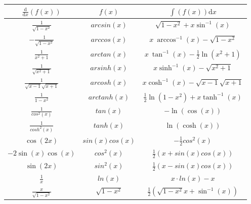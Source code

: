 \documentclass[paper=a3,paper=landscape, fontsize=9pt, DIV=30]{scrartcl}
\begin{document}
\begin{multicols*}{4}
        \begin{tabular}{|c|c|c|}
          \hline
           $\frac{\mathrm d}{\mathrm d x} \left( f(x) \right)$  & $f(x)$           & $\int \left( f(x) \right) \mathrm{d}x$   \\ \hline
           $\frac{1}{\sqrt{1-x^2}}$                             & $arcsin(x)$      & $\sqrt{1-x^2}+x \sin^{-1}(x)$             \\ \hline
           $-\frac{1}{\sqrt{1-x^2}}$                            & $arccos(x)$      & $x \ \arccos^{-1}(x)-\sqrt{1-x^2}$        \\ \hline
           $\frac{1}{x^2+1}$                                    & $arctan(x)$      & $x \ \tan^{-1}(x)-\frac{1}{2}\ln(x^2+1)$  \\ \hline
           $\frac{1}{\sqrt{x^2+1}}$                             & $arsinh(x)$      & $x \sinh^{-1}(x)-\sqrt{x^2+1}$            \\ \hline
           $\frac{1}{\sqrt{x-1}\sqrt{x+1}}$                     & $arcosh(x)$      & $x \cosh^{-1}(x)-\sqrt{x-1}\sqrt{x+1}$    \\ \hline
           $\frac{1}{1-x^2}$                                    & $arctanh(x)$      & $\frac{1}{2} \ln(1-x^2)+x \tanh^{-1}(x)$  \\ \hline
           $\frac{1}{cos^2(x)}$                                 & $tan(x)$         & $-\ln(\cos(x))$                           \\ \hline
           $\frac{1}{cosh^2(x)}$                                & $tanh(x)$        & $\ln(\cosh(x))$                           \\ \hline
           $\cos(2x)$                                           & $sin(x)cos(x)$   & $-\frac{1}{2}cos^2(x)$                    \\ \hline
           $-2\sin(x)\cos(x)$                                   & $cos^2(x)$       & $\frac{1}{2}(x+sin(x)cos(x))$             \\ \hline
           $\sin(2x)$                                           & $sin^2(x)$       & $\frac{1}{2}(x-sin(x)cos(x))$             \\ \hline
           $\frac{1}{x}$                                        & $ln(x)$          & $x \cdot ln(x)-x$                         \\ \hline
           $\frac{x}{\sqrt{1-x^2}}$                             & $\sqrt{1-x^2}$   & $\frac{1}{2}(\sqrt{1-x^2}x+\sin^{-1}(x))$  \\ \hline
        \end{tabular}


\end{multicols*}
\end{document}
